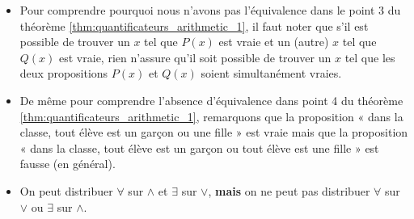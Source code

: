 \documentclass[10pt,notheorems]{beamer}
\theoremstyle{plain}
\theoremstyle{definition} %
\begin{document}
\begin{notes}
  \begin{itemize}

  \item Pour comprendre pourquoi nous n'avons pas l'équivalence dans le point 3 du théorème \hyperlink{slide_quantificateurs_proprietes_1}{\ref{thm:quantificateurs_arithmetic_1}}, il faut noter que s'il est possible de trouver un $x$ tel que $P(x)$ est vraie et un (autre) $x$ tel que $Q(x)$ est vraie, rien n'assure qu'il soit possible de trouver un $x$ tel que les deux propositions $P(x)$ et $Q(x)$ soient simultanément vraies.\newline

  \item De même pour comprendre l'absence d'équivalence dans point 4 du théorème \hyperlink{slide_quantificateurs_proprietes_1}{\ref{thm:quantificateurs_arithmetic_1}}, remarquons que la proposition « dans la classe, tout élève est un garçon ou une fille » est vraie mais que la proposition  « dans la classe, tout élève est un garçon ou tout élève est une fille » est fausse (en général).\newline

  \item[\dbend] On peut distribuer $\forall$ sur $\land$ et $\exists$ sur $\lor$, \textbf{mais} on ne peut pas distribuer $\forall$ sur $\lor$ ou $\exists$ sur $\land$.

  \end{itemize}
\end{notes}
\end{document}
